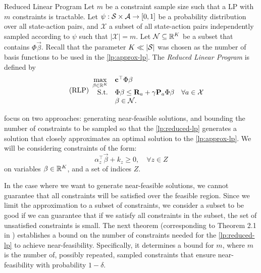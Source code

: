 \begin{dfn}{Reduced Linear Program \cite[Sec.~1.3]{farias2004constraint}}{}
    Let $m$ be a constraint sample size such that a LP with $m$ constraints is
    tractable. Let $\psi: \mathcal{S} \times \mathcal{A} \to [0, 1]$ be a probability
    distribution over all state-action pairs, and $\mathcal{X}$ a subset of all
    state-action pairs independently sampled according to $\psi$ such that
    $|\mathcal{X}| = m$. Let $\mathcal{N} \subseteq \mathbb{R}^K$ be a subset that
    contains $\Phi\vec{\beta}$. Recall that the parameter $K \ll |\mathcal{S}|$ was
    chosen as the number of basis functions to be used in the
    \eqref{lp:approx-lp}. The \emph{Reduced Linear Program} is defined by
    \begin{equation}
        \label{lp:reduced-lp}
        \tag{RLP}
        \begin{array}{rl@{}ll}
            \displaystyle \max_{\vec{\beta} \in \R^{K}} & \vec{c}^{\top} \Phi \vec{\beta} \\
            \text{S.t.} & \displaystyle \Phi \vec{\beta} \leq \vec{R}_a + \gamma \vec{P}_a \Phi \vec{\beta} & \quad \forall a \in \mathcal{X} \\
            & \vec{\beta} \in \mathcal{N}.
        \end{array}
    \end{equation}
\end{dfn}

\citeauthor{farias2004constraint} focus on two approaches: generating
near-feasible solutions, and bounding the number of constraints to be sampled so
that the \eqref{lp:reduced-lp} generates a solution that closely approximates an optimal solution
to the \eqref{lp:approx-lp}. We will be considering constraints of the form:
\[
    \alpha_{z}^{\top} \vec{\beta} + k_z \geq 0, \quad \forall z \in Z
\]
on variables $\mathbf{\beta} \in \mathbb{R}^{K}$, and a set of indices $Z$.

In the case where we want to generate near-feasible solutions, we cannot
guarantee that all constraints will be satisfied over the feasible region. Since
we limit the approximation to a subset of constraints, we consider a subset to
be good if we can guarantee that if we satisfy all constraints in the subset,
the set of unsatisfied constraints is small. The next theorem (corresponding to
Theorem 2.1 in \cite[pg.~467]{farias2004constraint}) establishes a bound on the
number of constraints needed for the \eqref{lp:reduced-lp} to achieve
near-feasibility. Specifically, it determines a bound for $m$, where $m$ is the
number of, possibly repeated, sampled constraints that ensure near-feasibility
with probability $1 - \delta$.

